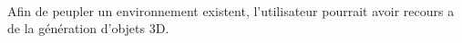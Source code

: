 \paragraph{}
Afin de peupler un environnement existent, l'utilisateur pourrait avoir recours a de la génération d'objets 3D. 
